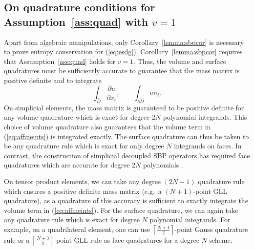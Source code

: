 \documentclass{svjour3}                     %
\renewcommand{\hat}{\widehat}
\newcommand{\pd}[2]{\frac{\partial#1}{\partial#2}}
\renewcommand{\note}[1]{{\color{blue}{#1}}}
\begin{document}
\subsection{On quadrature conditions for Assumption~\ref{ass:quad} with $v = 1$}
\label{sec:assump1}
Apart from algebraic manipulations, only Corollary~\ref{lemma:sbpcor} is necessary to prove entropy conservation for (\ref{eq:esdg}).  Corollary~\ref{lemma:sbpcor} requires that Assumption~\ref{ass:quad} holds for $v=1$.  Thus, the volume and surface quadratures must be sufficiently accurate to guarantee that the mass matrix is positive definite and to integrate 
\begin{equation}
\int_{\hat{D}} \pd{u}{x_i}, \qquad \int_{\partial \hat{D}} u n_i. \label{eq:affineints}
\end{equation}
On simplicial elements, the mass matrix is guaranteed to be positive definite for any volume quadrature which is exact for degree $2N$ polynomial integrands.  This choice of volume quadrature also guarantees that the volume term in (\ref{eq:affineints}) is integrated exactly.  The surface quadrature can thus be taken to be any quadrature rule which is exact for only degree $N$ integrands on faces.  In contrast, the construction of simplicial decoupled SBP operators has required face quadratures which are accurate for degree $2N$ polynomials \cite{chan2017discretely, chan2018discretely}.  

On tensor product elements, we can take any degree $(2N-1)$ quadrature rule which ensures a positive definite mass matrix (e.g.\ a $(N+1)$-point GLL quadrature), as a quadrature of this accuracy is sufficient to exactly integrate the volume term in (\ref{eq:affineints}).  For the surface quadrature, we can again take any quadrature rule which is exact for degree $N$ polynomial integrands.  For example, on a quadrilateral element, one can use $\left\lceil\frac{N+1}{2}\right\rceil$-point Gauss quadrature rule or a $\left\lceil\frac{N+3}{2}\right\rceil$-point GLL rule as face quadratures for a degree $N$ scheme.  

\end{document}
